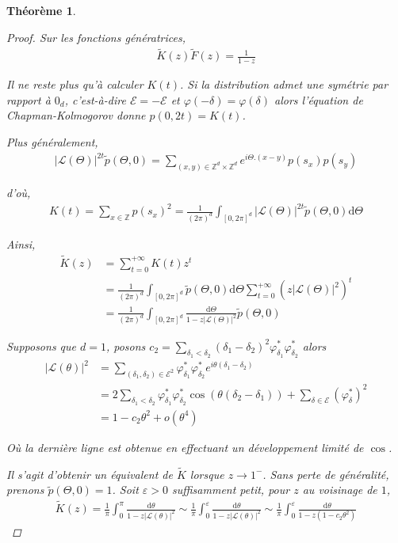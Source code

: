 \documentclass{article}
\newtheorem{theorem}{Théorème}[section]
\begin{document}
\begin{theorem}
\begin{proof}
Sur les fonctions génératrices,
\begin{align*}
	\tilde{K}(z)\tilde{F}(z) = \frac{1}{1-z} \tag{2}
\end{align*}

Il ne reste plus qu'à calculer $K(t)$. Si la distribution admet une symétrie par rapport à $0_d$, c'est-à-dire $\mathcal{E} = -\mathcal{E}$ et $\varphi(-\delta) = \varphi(\delta)$ alors l'équation de Chapman-Kolmogorov donne $p(0,2t) = K(t)$. 


Plus généralement,
	\begin{align*}
		|\mathcal{L}(\Theta)|^{2t}\tilde{p}(\Theta,0) = \sum_{(x,y)\in\mathbb{Z}^d\times\mathbb{Z}^d} e^{i\Theta.(x-y)}p(s_x)p(s_y)
	\end{align*}

	d'où, 
\begin{align*}
	K(t) = \sum_{x\in \mathbb{Z}}p(s_x)^2 = \frac{1}{(2\pi)^d}\int_{[0,2\pi]^d}|\mathcal{L}(\Theta)|^{2t} \tilde{p}(\Theta, 0)\mathrm{d}\Theta
	\end{align*}

Ainsi, 
\begin{align*}
	\tilde{K}(z) &= \sum_{t=0}^{+\infty} K(t) z^t\\
		     &=\frac{1}{(2\pi)^d}\int_{[0,2\pi]^d}\tilde{p}(\Theta,0)\mathrm{d}\Theta\sum_{t=0}^{+\infty} (z|\mathcal{L}(\Theta)|^2)^t\\
		     &=\frac{1}{(2\pi)^d}\int_{[0,2\pi]^d}\frac{\mathrm{d}\Theta}{1-z|\mathcal{L}(\Theta)|^{2}}\tilde{p}(\Theta, 0)
\end{align*}

Supposons que $d=1$, posons $c_2 = \sum_{\delta_1<\delta_2} (\delta_1-\delta_2)^2 \varphi_{\delta_1}^*\varphi_{\delta_2}^*$ alors
\begin{align*}
|\mathcal{L}(\theta)|^2 &= \sum_{(\delta_1,\delta_2)\in\mathcal{E}^2} \varphi^*_{\delta_1}\varphi^*_{\delta_2} e^{i\theta(\delta_1-\delta_2)}\\
			&= 2\sum_{\delta_1<\delta_2} \varphi^*_{\delta_1}\varphi^*_{\delta_2}\cos(\theta(\delta_2-\delta_1)) + \sum_{\delta\in \mathcal{E}}(\varphi^*_{\delta})^2\\
			&= 1-c_2\theta^2+o(\theta^4)
\end{align*}

Où la dernière ligne est obtenue en effectuant un développement limité de $\cos$.

Il s'agit d'obtenir un équivalent de $\tilde{K}$ lorsque $z\to 1^-$. Sans perte de généralité, prenons $\tilde{p}(\Theta,0) = 1$. Soit $\varepsilon > 0$ suffisamment petit, pour $z$ au voisinage de $1$, 
\begin{align*}
	\tilde{K}(z) = \frac{1}{\pi}\int_{0}^{\pi}\frac{\mathrm{d}\theta}{1-z|\mathcal{L}(\theta)|^2} \sim \frac{1}{\pi}\int_{0}^{\varepsilon} \frac{\mathrm{d}\theta}{1-z|\mathcal{L}(\theta)|^2}\sim\frac{1}{\pi}\int_{0}^{\varepsilon}\frac{\mathrm{d}\theta}{1-z(1-c_2\theta^2)} 
\end{align*}


\end{proof}
\end{theorem}
\end{document}
